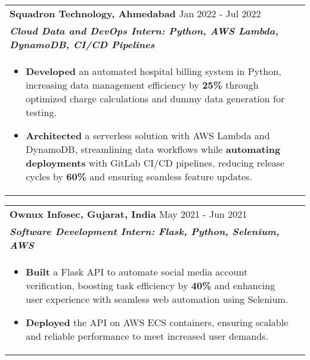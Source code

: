 \documentclass[a4paper,10pt]{article}
\begin{document}
\vspace{-1mm}
\begin{tabularx}{\linewidth}{ @{}l r@{} }
\textbf{Squadron Technology, Ahmedabad} \hfill \color[HTML]{371e77} Jan 2022 - Jul 2022 \\[1pt]
\color[HTML]{371e77}\textbf{\textit{Cloud Data and DevOps Intern: Python, AWS Lambda, DynamoDB, CI/CD Pipelines}} \\[1pt]
\begin{minipage}[t]{\linewidth}
\begin{itemize}[nosep, after=\strut, leftmargin=2em, itemsep=2pt]
\item \textbf{Developed} an automated hospital billing system in Python, increasing data management efficiency by \textbf{25\%} through optimized charge calculations and dummy data generation for testing.
\item \textbf{Architected} a serverless solution with AWS Lambda and DynamoDB, streamlining data workflows while \textbf{automating deployments} with GitLab CI/CD pipelines, reducing release cycles by \textbf{60\%} and ensuring seamless feature updates.
\end{itemize}
\end{minipage}

\end{tabularx}

\vspace{2pt}

\begin{tabularx}{\linewidth}{ @{}l r@{} }
\textbf{Ownux Infosec, Gujarat, India} \hfill \color[HTML]{371e77} May 2021 - Jun 2021 \\[1pt]
\color[HTML]{371e77}\textbf{\textit{Software Development Intern: Flask, Python, Selenium, AWS}} \\[1pt]
\begin{minipage}[t]{\linewidth}
\begin{itemize}[nosep, after=\strut, leftmargin=2em, itemsep=2pt]
\item \textbf{Built} a Flask API to automate social media account verification, boosting task efficiency by \textbf{40\%} and enhancing user experience with seamless web automation using Selenium.
\item \textbf{Deployed} the API on AWS ECS containers, ensuring scalable and reliable performance to meet increased user demands.
\end{itemize}
\end{minipage}

\end{tabularx}
\end{document}
